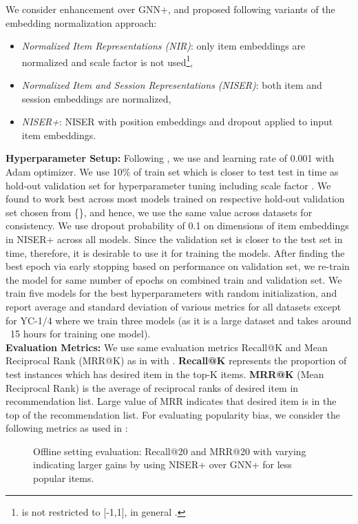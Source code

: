 \documentclass[sigconf]{acmart}
\begin{document}
We consider enhancement over GNN+, and proposed following variants of the embedding normalization approach: 
\begin{itemize}
\item \textit{Normalized Item Representations (NIR)}: only item embeddings are normalized and scale factor  is not used\footnote{ is not restricted to [-1,1], in general .},
\item \textit{Normalized Item and Session Representations (NISER)}: both item and session embeddings are normalized,
\item \textit{NISER+}: NISER with position embeddings and dropout applied to input item embeddings.
\end{itemize}

\textbf{Hyperparameter Setup:} 
Following \cite{wu2018session}, 
we use  and learning rate of 0.001 with Adam optimizer. 
We use 10\% of train set which is closer to test test in time as hold-out validation set for hyperparameter tuning including scale factor .
We found  to work best across most models trained on respective hold-out validation set chosen from \{\}, and hence, we use the same value across datasets for consistency. 
We use dropout probability of 0.1 on dimensions of item embeddings in NISER+ across all models.
Since the validation set is closer to the test set in time, therefore, it is desirable to use it for training the models. After finding the best epoch via early stopping based on performance on validation set, we re-train the model for same number of epochs on combined train and validation set.
We train five models for the best hyperparameters with random initialization, and report average and standard deviation of various metrics for all datasets except for YC-1/4 where we train three models (as it is a large dataset and takes around ~15 hours for training one model). 
\\
\textbf{Evaluation Metrics:}
We use same evaluation metrics Recall@K and Mean Reciprocal Rank (MRR@K) as in \cite{wu2018session} with .
\textbf{Recall@K} represents the proportion of test instances which has desired item in the top-K items.
\textbf{MRR@K} (Mean Reciprocal Rank) is the average of reciprocal ranks of desired item in recommendation list. 
Large value of MRR indicates that desired item is in the top of the recommendation list.
For evaluating popularity bias, we consider the following metrics as used in \cite{abdollahpouri2019managing}:
	\begin{figure*}[t]
			\vspace{-2mm}
			\caption{Offline setting evaluation: Recall@20 and MRR@20 with varying  indicating larger gains by using NISER+ over GNN+ for less popular items. \label{fig:recall-vs-phi}}
\end{figure*}
		
\end{document}
